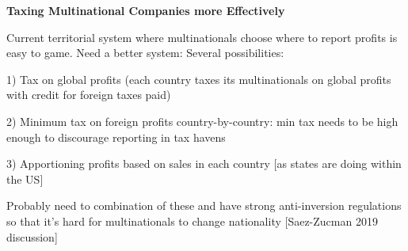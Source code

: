 \documentclass[landscape]{slides}
\begin{document}
\begin{slide}

\end{slide}

%

\begin{slide}
\begin{center}
{\bf Taxing Multinational Companies more Effectively}
\end{center}
Current territorial system where multinationals choose where to report
profits is easy to game. Need a better system: Several possibilities:

1) Tax on global profits (each country taxes its multinationals on global profits with
credit for foreign taxes paid)

2) Minimum tax on foreign profits country-by-country: min tax needs to be high enough to discourage reporting
in tax havens 

3) Apportioning profits based on sales in each country [as states are doing within the US]

Probably need to combination of these and have strong anti-inversion regulations so
that it's hard for multinationals to change nationality [Saez-Zucman 2019 discussion]

\end{slide}


%
%
%
%
%
%
%
%
%
%
%
%
%
%
%
\end{document}
